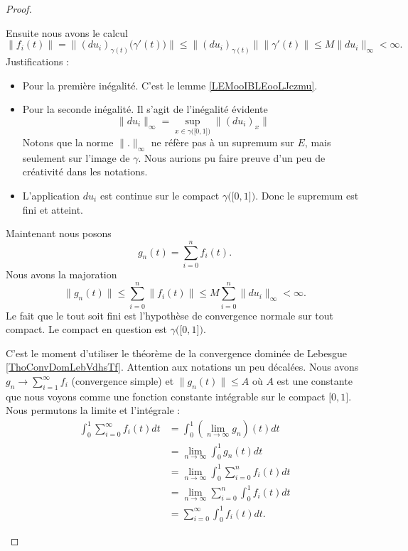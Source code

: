 \begin{proof}
\begin{subproof}
		Ensuite nous avons le calcul
		\begin{equation}
			\| f_i(t) \|=\| (du_i)_{\gamma(t)}\big( \gamma'(t) \big) \|
			\leq\| (du_i)_{\gamma(t)} \|\| \gamma'(t) \|
			\leq M\| du_i \|_{\infty}<\infty.
		\end{equation}
		Justifications :
		\begin{itemize}
			\item
			      Pour la première inégalité. C'est le lemme \ref{LEMooIBLEooLJczmu}.
			\item Pour la seconde inégalité. Il s'agit de l'inégalité évidente
			      \begin{equation}
				      \| du_i \|_{\infty}=\sup_{x\in \gamma\big( \mathopen[ 0 , 1 \mathclose] \big)}\| (du_i)_x \|
			      \end{equation}
			      Notons que la norme \( \| . \|_{\infty}\) ne réfère pas à un supremum sur \( E\), mais seulement sur l'image de \( \gamma\). Nous aurions pu faire preuve d'un peu de créativité dans les notations.
			\item
			      L'application \( du_i\) est continue sur le compact \( \gamma\big( \mathopen[ 0 , 1 \mathclose] \big)\). Donc le supremum est fini et atteint.
		\end{itemize}

		Maintenant nous posons
		\begin{equation}
			g_n(t)=\sum_{i=0}^nf_i(t).
		\end{equation}
		Nous avons la majoration
		\begin{equation}
			\| g_n(t) \|\leq \sum_{i=0}^n\| f_i(t) \|\leq M\sum_{i=0}^n\| du_i \|_{\infty}<\infty.
		\end{equation}
		Le fait que le tout soit fini est l'hypothèse de convergence normale sur tout compact. Le compact en question est \( \gamma\big( \mathopen[ 0 , 1 \mathclose] \big)\).

		C'est le moment d'utiliser le théorème de la convergence dominée de Lebesgue \ref{ThoConvDomLebVdhsTf}. Attention aux notations un peu décalées. Nous avons \( g_n\to \sum_{i=1}^{\infty}f_i\) (convergence simple) et \( \| g_n(t) \|\leq A\) où \( A\) est une constante que nous voyons comme une fonction constante intégrable sur le compact \( \mathopen[ 0 , 1 \mathclose]\). Nous permutons la limite et l'intégrale :
		\begin{subequations}
			\begin{align}
				\int_0^1\sum_{i=0}^{\infty}f_i(t)dt & =\int_0^1(\lim_{n\to \infty} g_n)(t)dt             \\
				                                    & =\lim_{n\to \infty} \int_0^1g_n(t)dt               \\
				                                    & =\lim_{n\to \infty} \int_{0}^1\sum_{i=0}^nf_i(t)dt \\
				                                    & =\lim_{n\to \infty} \sum_{i=0}^n\int_0^1f_i(t)dt   \\
				                                    & =\sum_{i=0}^{\infty}\int_0^1f_i(t)dt.
			\end{align}
		\end{subequations}
		\spitem[Accroissements]


\end{subproof}
\end{proof}
